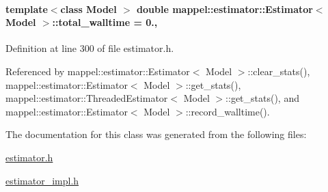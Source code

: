 \paragraph[{\texorpdfstring{total\+\_\+walltime}{total_walltime}}]{\setlength{\rightskip}{0pt plus 5cm}template$<$class Model $>$ double {\bf mappel\+::estimator\+::\+Estimator}$<$ Model $>$\+::total\+\_\+walltime = 0.\hspace{0.3cm}{\ttfamily [protected]}, {\ttfamily [inherited]}}\hypertarget{classmappel_1_1estimator_1_1Estimator_a98ad459e850aeb2c42c10fd06c3b9fbc}{}\label{classmappel_1_1estimator_1_1Estimator_a98ad459e850aeb2c42c10fd06c3b9fbc}


Definition at line 300 of file estimator.\+h.



Referenced by mappel\+::estimator\+::\+Estimator$<$ Model $>$\+::clear\+\_\+stats(), mappel\+::estimator\+::\+Estimator$<$ Model $>$\+::get\+\_\+stats(), mappel\+::estimator\+::\+Threaded\+Estimator$<$ Model $>$\+::get\+\_\+stats(), and mappel\+::estimator\+::\+Estimator$<$ Model $>$\+::record\+\_\+walltime().



The documentation for this class was generated from the following files\+:\begin{DoxyCompactItemize}
\item 
\hyperlink{estimator_8h}{estimator.\+h}\item 
\hyperlink{estimator__impl_8h}{estimator\+\_\+impl.\+h}\end{DoxyCompactItemize}
